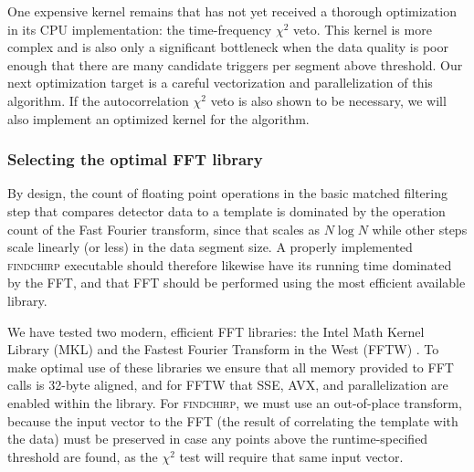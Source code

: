 One expensive kernel remains that has not yet received a thorough optimization
in its CPU implementation: the time-frequency $\chi^2$ veto.  This kernel is more complex and
is also only a significant bottleneck when the data quality is poor enough that
there are many candidate triggers per segment above threshold. %
Our next
optimization target is a careful vectorization and parallelization of this
algorithm. %
If the
autocorrelation $\chi^2$ veto is also
shown to be necessary, we
will also implement an optimized kernel for the algorithm. 


\vspace*{-10pt}
\subsubsection{Selecting the optimal FFT library}
\vspace*{-05pt}
\label{sec:opt-fft}

By design, the count of floating point operations in the basic matched filtering
step that compares detector data to a template is dominated by the operation
count of the Fast Fourier transform, since that scales as $N\log{N}$ while other
steps scale linearly (or less) in the data segment size. A properly implemented
\textsc{findchirp} executable should therefore likewise have its running time
dominated by the FFT, and that FFT should be performed using the most efficient
available library.

We have tested two modern, efficient FFT libraries: the Intel Math Kernel
Library (MKL) and the Fastest Fourier Transform in the West (FFTW)
\cite{FFTW05}. To make optimal use of these libraries we ensure that all memory 
provided to FFT calls is 32-byte aligned, and for FFTW
that SSE, AVX, and parallelization are enabled within the
library. For \textsc{findchirp}, we must use an out-of-place transform, because
the input vector to the FFT (the result of correlating the template with the
data) must be preserved in case any points above the runtime-specified threshold
are found, as the $\chi^2$ test will require that same input vector.

